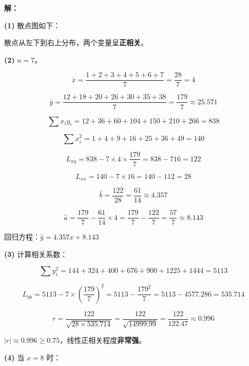 \documentclass[12pt, a4paper]{ctexart}
\begin{document}
\textbf{解：}

\textbf{(1)} 散点图如下：

\begin{center}
\end{center}

散点从左下到右上分布，两个变量呈\textbf{正相关}。

\medskip
\textbf{(2)} $n = 7$。

\[
\bar{x} = \frac{1+2+3+4+5+6+7}{7} = \frac{28}{7} = 4
\]

\[
\bar{y} = \frac{12+18+20+26+30+35+38}{7} = \frac{179}{7} \approx 25.571
\]

\[
\sum x_iy_i = 12 + 36 + 60 + 104 + 150 + 210 + 266 = 838
\]

\[
\sum x_i^2 = 1 + 4 + 9 + 16 + 25 + 36 + 49 = 140
\]

\[
L_{xy} = 838 - 7 \times 4 \times \frac{179}{7} = 838 - 716 = 122
\]

\[
L_{xx} = 140 - 7 \times 16 = 140 - 112 = 28
\]

\[
\hat{b} = \frac{122}{28} = \frac{61}{14} \approx 4.357
\]

\[
\hat{a} = \frac{179}{7} - \frac{61}{14} \times 4 = \frac{179}{7} - \frac{122}{7} = \frac{57}{7} \approx 8.143
\]

回归方程：$\boxed{\hat{y} = 4.357x + 8.143}$

\medskip
\textbf{(3)} 计算相关系数：

\[
\sum y_i^2 = 144 + 324 + 400 + 676 + 900 + 1225 + 1444 = 5113
\]

\[
L_{yy} = 5113 - 7 \times \left(\frac{179}{7}\right)^2 = 5113 - \frac{179^2}{7} = 5113 - 4577.286 = 535.714
\]

\[
r = \frac{122}{\sqrt{28 \times 535.714}} = \frac{122}{\sqrt{14999.99}} = \frac{122}{122.47} \approx 0.996
\]

$|r| \approx 0.996 \geqslant 0.75$，线性正相关程度\textbf{非常强}。

\medskip
\textbf{(4)} 当 $x = 8$ 时：
\end{document}
